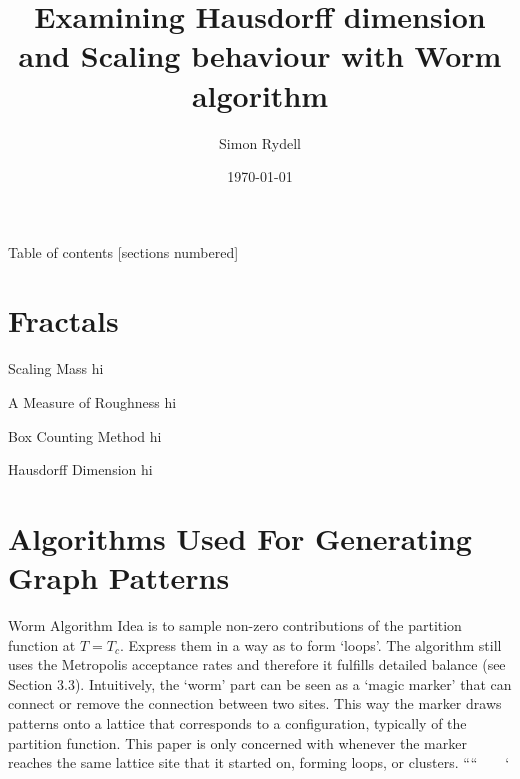 \documentclass[10pt]{beamer}
\title{Examining Hausdorff dimension and Scaling behaviour with Worm algorithm}
\date{\today}
\date{}
\author{Simon Rydell}
\institute{Royal Institute of Technology, Stockholm}
\begin{document}
\maketitle

\begin{frame}{Table of contents}
  [sections numbered]
  \tableofcontents[hideallsubsections]
\end{frame}

\section{Fractals}

\begin{frame}{Scaling Mass}
    hi
\end{frame}

\begin{frame}{A Measure of Roughness}
    hi
\end{frame}

\begin{frame}{Box Counting Method}
    hi
\end{frame}

\begin{frame}{Hausdorff Dimension}
    hi
\end{frame}

\section{Algorithms Used For Generating Graph Patterns}

\begin{frame}{Worm Algorithm}
    Idea is to sample non-zero contributions of the partition function at $T = T_c$. Express them in a way as to form `loops'.
The algorithm still uses the Metropolis acceptance rates and therefore it fulfills detailed balance (see Section 3.3).
Intuitively, the ‘worm’ part can be seen as a ‘magic marker’ that can connect or remove the connection between two sites. This way the marker draws patterns onto a lattice that corresponds to a configuration, typically of the partition function. This paper is only concerned with whenever the marker reaches the same lattice site that it started on, forming loops, or clusters.   ````~~~~`  
\end{frame}
\end{document}
